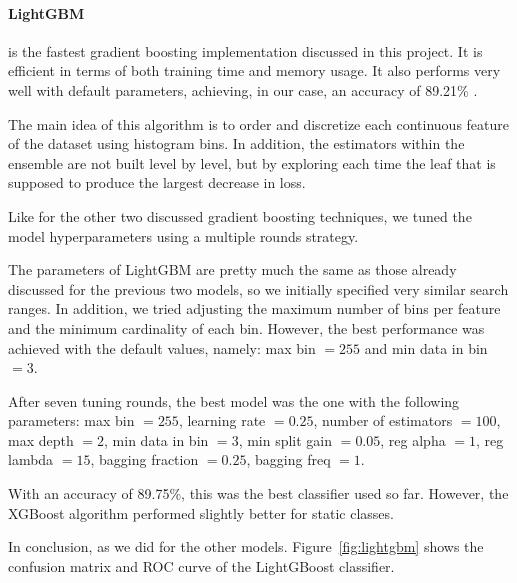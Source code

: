 \documentclass[10pt, a4paper, twocolumn]{article}
\begin{document}
\paragraph{LightGBM} is the fastest gradient boosting implementation discussed in this project. It is efficient in terms of both training time and memory usage. It also performs very well with default parameters, achieving, in our case, an accuracy of 89.21\% .

The main idea of this algorithm is to order and discretize each continuous feature of the dataset using histogram bins. In addition, the estimators within the ensemble are not built level by level, but by exploring each time the leaf that is supposed to produce the largest decrease in loss.

Like for the other two discussed gradient boosting techniques, we tuned the model hyperparameters using a multiple rounds strategy. 

The parameters of LightGBM are pretty much the same as those already discussed for the previous two models, so we initially specified very similar search ranges. In addition, we tried adjusting the maximum number of bins per feature and the minimum cardinality of each bin. However, the best performance was achieved with the default values, namely: max bin $=255$ and min data in bin $=3$. 

After seven tuning rounds, the best model was the one with the following parameters: max bin $=255$, learning rate $=0.25$, number of estimators $=100$, max depth $=2$, min data in bin $=3$, min split gain $=0.05$, reg  alpha $=1$, reg lambda $=15$, bagging fraction $=0.25$, bagging freq $=1$.

With an accuracy of 89.75\%, this was the best classifier used so far. However, the XGBoost algorithm performed slightly better for static classes.

In conclusion, as we did for the other models. Figure~\ref{fig:lightgbm} shows the confusion matrix and ROC curve of the LightGBoost classifier.
\end{document}
